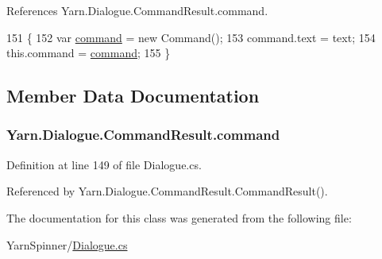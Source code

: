 References Yarn.\-Dialogue.\-Command\-Result.\-command.


\begin{DoxyCode}
151                                                \{
152                 var \hyperlink{a00042_a420ca0984d6e5c33bb761654305c592e}{command} = \textcolor{keyword}{new} Command();
153                 command.text = text;
154                 this.command = \hyperlink{a00042_a420ca0984d6e5c33bb761654305c592e}{command};
155             \}
\end{DoxyCode}


\subsection{Member Data Documentation}
\hypertarget{a00042_a420ca0984d6e5c33bb761654305c592e}{
\subsubsection[{command}]{ Yarn.\-Dialogue.\-Command\-Result.\-command}}\label{a00042_a420ca0984d6e5c33bb761654305c592e}


Definition at line 149 of file Dialogue.\-cs.



Referenced by Yarn.\-Dialogue.\-Command\-Result.\-Command\-Result().



The documentation for this class was generated from the following file\-:\begin{DoxyCompactItemize}
\item 
Yarn\-Spinner/\hyperlink{a00290}{Dialogue.\-cs}\end{DoxyCompactItemize}
